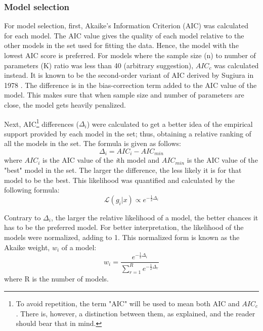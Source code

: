 \documentclass[11pt]{article}
\begin{document}
\begin{linenumbers}
	\subsubsection{Model selection}
	\par For model selection, first, Akaike's Information Criterion (AIC) \cite{Akaike1973} was calculated for each model. The AIC value gives the quality of each model relative to the other models in the set used for fitting the data. Hence, the model with the lowest AIC score is preferred. For models where the sample size (n) to number of parameters (K) ratio was less than 40 (arbitrary suggestion), $AIC_c$ was calculated instead. It is known to be the second-order variant of AIC derived by Sugiura  in 1978 \cite{Sugiura1978}. The difference is in the bias-correction term added to the AIC value of the model. This makes sure that when sample size and number of parameters are close, the model gets heavily penalized.
	\par Next, AIC\footnote[1]{To avoid repetition, the term "AIC" will be used to mean both AIC and $AIC_c$. There is, however, a distinction between them, as explained, and the reader should bear that in mind.} differences ($\Delta_i$) were calculated to get a better idea of the empirical support provided by each model in the set; thus, obtaining a relative ranking of all the models in the set. The formula is given as follows:
	\begin{equation}
		\Delta_i = AIC_i - AIC_{min}
	\end{equation}
	where $AIC_i$ is the AIC value of the \emph{i}th model and $AIC_{min}$ is the AIC value of the "best" model in the set. The larger the difference, the less likely it is for that model to be the best. This likelihood was quantified and calculated by the following formula:
	\begin{equation}
		\mathcal{L}(g_i|x) \propto e^{-\frac{1}{2}\Delta_i}
	\end{equation}
	
	\par Contrary to $\Delta_i$, the larger the relative likelihood of a model, the better chances it has to be the preferred model.
	For better interpretation, the likelihood of the models were normalized, adding to 1. This normalized form is known as the Akaike weight, $w_i$ of a model:
	\begin{equation}
		w_i = \frac{e^{-\frac{1}{2}\Delta_i}}{\displaystyle\sum_{r=1}^{R} e^{-\frac{1}{2}\Delta_r}}
	\end{equation}
	where R is the number of models.
	

\end{linenumbers}
\end{document}
